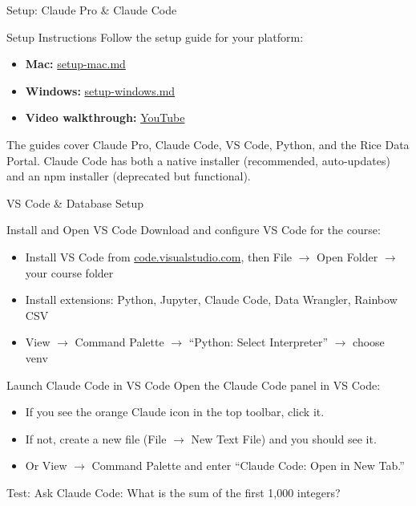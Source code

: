 \documentclass[aspectratio=169,t]{beamer}
\begin{document}

\begin{frame}[c]
\centering
\Huge Setup: Claude Pro \& Claude Code
\end{frame}

\begin{frame}{Setup Instructions}
Follow the setup guide for your platform:

\begin{itemize}
\item \textbf{Mac:} \href{https://busi722.kerryback.com/files/setup-mac.md}{setup-mac.md}
\item \textbf{Windows:} \href{https://busi722.kerryback.com/files/setup-windows.md}{setup-windows.md}
\item \textbf{Video walkthrough:} \href{https://www.youtube.com/watch?v=hpMrTabldEY}{YouTube}
\end{itemize}

\vspace{0.3cm}
The guides cover Claude Pro, Claude Code, VS Code, Python, and the Rice Data Portal.  Claude Code has both a \alert{native installer} (recommended, auto-updates) and an \alert{npm installer} (deprecated but functional).
\end{frame}


\begin{frame}[c]
\centering
\Huge VS Code \& Database Setup
\end{frame}

\begin{frame}{Install and Open VS Code}
Download and configure VS Code for the course:
\begin{itemize}
\item Install VS Code from \href{https://code.visualstudio.com}{code.visualstudio.com}, then File $\rightarrow$ Open Folder $\rightarrow$ your course folder
\item Install extensions: Python, Jupyter, Claude Code, Data Wrangler, Rainbow CSV
\item View $\rightarrow$ Command Palette $\rightarrow$ ``Python: Select Interpreter'' $\rightarrow$ choose venv
\end{itemize}
\end{frame}

\begin{frame}{Launch Claude Code in VS Code}
Open the Claude Code panel in VS Code:
\begin{itemize}
\item If you see the orange Claude icon in the top toolbar, click it.
\item If not, create a new file (File $\rightarrow$ New Text File) and you should see it.
\item Or View $\rightarrow$ Command Palette and enter ``Claude Code: Open in New Tab.''
\end{itemize}
\vspace{0.5cm}
Test: Ask Claude Code: What is the sum of the first 1,000 integers?
\end{frame}
\end{document}
